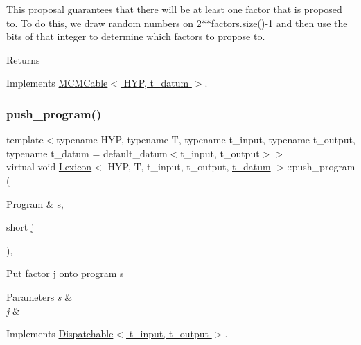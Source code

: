 This proposal guarantees that there will be at least one factor that is proposed to. To do this, we draw random numbers on 2$\ast$$\ast$factors.size()-\/1 and then use the bits of that integer to determine which factors to propose to. \begin{DoxyReturn}{Returns}

\end{DoxyReturn}


Implements \hyperlink{class_m_c_m_cable_ab119a14256ab92c5c1e941f8492df830}{M\+C\+M\+Cable$<$ H\+Y\+P, t\+\_\+datum $>$}.

\mbox{\label{class_lexicon_af85ffc6944b66e92f760aaf7e3521d23}} 
\subsubsection{\texorpdfstring{push\+\_\+program()}{push\_program()}}
{\footnotesize\ttfamily template$<$typename H\+YP, typename T, typename t\+\_\+input, typename t\+\_\+output, typename t\+\_\+datum = default\+\_\+datum$<$t\+\_\+input, t\+\_\+output$>$$>$ \\
virtual void \hyperlink{class_lexicon}{Lexicon}$<$ H\+YP, T, t\+\_\+input, t\+\_\+output, \hyperlink{class_bayesable_a7c93a2eeab708378eb321745908718d4}{t\+\_\+datum} $>$\+::push\+\_\+program (\begin{DoxyParamCaption}\item[{Program \&}]{s,  }\item[{short}]{j }\end{DoxyParamCaption})\hspace{0.3cm}{\ttfamily [inline]}, {\ttfamily [virtual]}}

Put factor j onto program s 
\begin{DoxyParams}{Parameters}
{\em s} & \\
\hline
{\em j} & \\
\hline
\end{DoxyParams}


Implements \hyperlink{class_dispatchable_a9339c2906f7c8dadbe1d0ca79dd9bb11}{Dispatchable$<$ t\+\_\+input, t\+\_\+output $>$}.

\mbox{\label{class_lexicon_a4ffff098d0f444d3e9ec543bbd228595}} 
